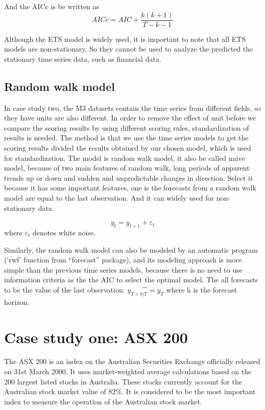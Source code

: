 \documentclass{monashthesis}
\theoremstyle{definition}
\theoremstyle{definition}
\theoremstyle{definition}
\theoremstyle{remark}
\begin{document}
And the AICc is be written as \[AICc=AIC+\frac{k(k+1)}{T-k-1}\]

Although the ETS model is widely used, it is important to note that all
ETS models are non-stationary. So they cannot be used to analyze the
predicted the stationary time series data, such as financial data.

\section{Random walk model}\label{random-walk-model}

In case study two, the M3 datasets contain the time series from
different fields, so they have units are also different. In order to
remove the effect of unit before we compare the scoring results by using
different scoring rules, standardization of results is needed. The
method is that we use the time series models to get the scoring results
divided the results obtained by our chosen model, which is used for
standardization. The model is random walk model, it also be called naive
model, because of two main features of random walk, long periods of
apparent trends up or down and sudden and unpredictable changes in
direction. Select it because it has some important features, one is the
forecasts from a random walk model are equal to the last observation.
And it can widely used for non-stationary data.

\[y_t=y_{t-1}+\varepsilon_t\] where \(\varepsilon_t\) denotes white
noise.

Similarly, the random walk model can also be modeled by an automatic
program (`rwf' function from ``forecast'' package), and its modeling
approach is more simple than the previous time series models, because
there is no need to use information criteria as the the AIC to select
the optimal model. The all forecasts to be the value of the last
observation: \(\hat{y_{T+h|T}=y_T}\) where h is the forecast horizon.

\chapter{Case study one: ASX 200}\label{case-study-one-asx-200}

The ASX 200 is an index on the Australian Securities Exchange officially
released on 31st March 2000. It uses market-weighted average
calculations based on the 200 largest listed stocks in Australia. These
stocks currently account for the Australian stock market value of 82\%.
It is considered to be the most important index to measure the operation
of the Australian stock market.
\end{document}
